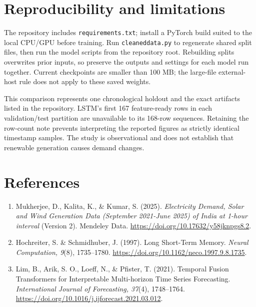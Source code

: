 \documentclass[11pt,a4paper]{article}
\begin{document}
\section{Reproducibility and limitations}
The repository includes \texttt{requirements.txt}; install a PyTorch build suited to the local CPU/GPU before training. Run \texttt{cleaneddata.py} to regenerate shared split files, then run the model scripts from the repository root. Rebuilding splits overwrites prior inputs, so preserve the outputs and settings for each model run together. Current checkpoints are smaller than 100 MB; the large-file external-host rule does not apply to these saved weights.

This comparison represents one chronological holdout and the exact artifacts listed in the repository. LSTM's first 167 feature-ready rows in each validation/test partition are unavailable to its 168-row sequences. Retaining the row-count note prevents interpreting the reported figures as strictly identical timestamp samples. The study is observational and does not establish that renewable generation causes demand changes.

\section{References}
\begin{enumerate}[leftmargin=*]
\item Mukherjee, D., Kalita, K., \& Kumar, S. (2025). \textit{Electricity Demand, Solar and Wind Generation Data (September 2021-June 2025) of India at 1-hour interval} (Version 2). Mendeley Data. \url{https://doi.org/10.17632/y58jknpgs8.2}.
\item Hochreiter, S. \& Schmidhuber, J. (1997). Long Short-Term Memory. \textit{Neural Computation, 9}(8), 1735--1780. \url{https://doi.org/10.1162/neco.1997.9.8.1735}.
\item Lim, B., Arik, S. O., Loeff, N., \& Pfister, T. (2021). Temporal Fusion Transformers for Interpretable Multi-horizon Time Series Forecasting. \textit{International Journal of Forecasting, 37}(4), 1748--1764. \url{https://doi.org/10.1016/j.ijforecast.2021.03.012}.
\end{enumerate}
\end{document}
